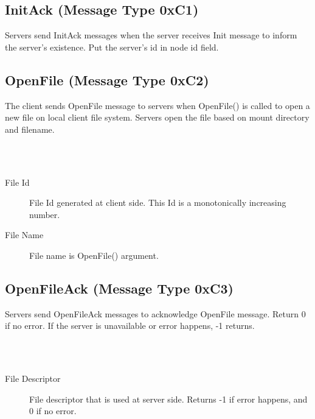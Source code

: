 \documentclass[12pt,fleqn]{article}
\begin{document}
\subsection{InitAck (Message Type 0xC1)}
Servers send InitAck messages when the server receives Init message to inform the server's existence. Put the server's id in node id field.

\subsection{OpenFile (Message Type 0xC2)}
The client sends OpenFile message to servers when OpenFile() is called to open a new file on local client file system. Servers open the file based on mount directory and filename.

\begin{center}
	\begin{bytefield}[bitwidth=1.1em]{16}
		 \\
		 \\
	\end{bytefield}
\end{center}

\begin{description}
	\item[File Id] File Id generated at client side. This Id is a monotonically increasing number.
	\item[File Name] File name is OpenFile() argument. 
\end{description}

\subsection{OpenFileAck (Message Type 0xC3)}
Servers send OpenFileAck messages to acknowledge OpenFile message. Return 0 if no error. If the server is unavailable or error happens, -1 returns. 

\begin{center}
	\begin{bytefield}[bitwidth=1.1em]{16}
		 \\
		 \\
	\end{bytefield}
\end{center}

\begin{description}
	\item[File Descriptor] File descriptor that is used at server side. Returns -1 if error happens, and 0 if no error.
\end{description}
\end{document}
